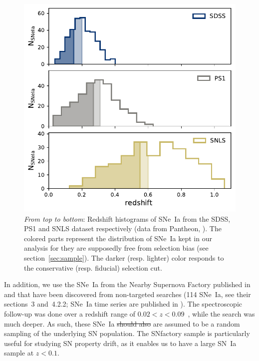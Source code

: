 \documentclass[]{aa} %
\newcommand{\mr}[1]{{\textcolor[rgb]{0.60,0.10,0.6}{#1}}}
\newcommand{\yc}[1]{{\textcolor{BrickRed}{#1}}}
\begin{document}
\begin{figure}
    \centering
    \includegraphics[width=0.95\linewidth]{Article_figures/hist_surveys_cuts_55-cividis.pdf}
    \caption{\textit{From top to bottom}: Redshift histograms of SNe~Ia from
        the SDSS, PS1 and SNLS dataset respectively (data from Pantheon,
        \citealt{scolnic2018a}).  The colored parts represent the distribution
        of SNe~Ia kept in our analysis for they are supposedly free from
        selection bias (see section~\ref{sec:sample}). The darker (resp. lighter)
    color responds to the conservative (resp. fiducial) selection cut.}
    \label{fig:cuts}
\end{figure}

In addition, we use the SNe~Ia from the Nearby Supernova Factory
\citep[SNfactory,][]{aldering2002} published in \cite{rigault2018} and that have
been discovered from non-targeted searches (114 SNe~Ia, see their sections~3 and~4.2.2; \mr{SNe~Ia time series are published in \citealt{Saunders2020}}). 
The spectroscopic follow-up was done over a redshift range of
$0.02<z<0.09$~\citep[as in ][]{rigault2018}, while the search was much
deeper. As such, these SNe~Ia \yc{\sout{should also} are assumed to} be a random sampling of the underlying
SN population. The SNfactory sample is particularly useful for studying SN property
drift, as it enables us to have a large SN~Ia sample at $z<0.1$.  
\end{document}
